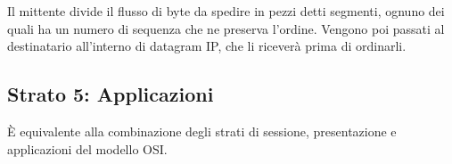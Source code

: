             Il mittente divide il flusso di byte da spedire in pezzi detti segmenti, ognuno dei quali ha un numero di sequenza che ne preserva l'ordine. Vengono poi passati al destinatario all'interno di datagram IP, che li riceverà prima di ordinarli.
    
    \subsection{Strato 5: Applicazioni}
        È equivalente alla combinazione degli strati di sessione, presentazione e applicazioni del modello OSI.